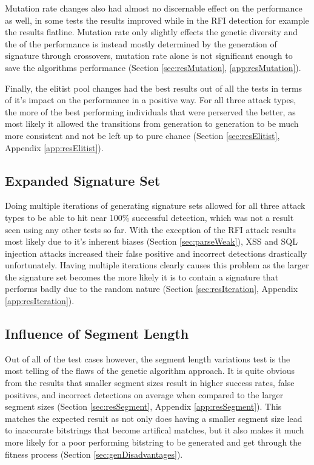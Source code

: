 Mutation rate changes also had almost no discernable effect on the performance as well, in some tests the results improved while in the RFI detection for example the results flatline.  Mutation rate only slightly effects the genetic diversity and the of the performance is instead mostly determined by the generation of signature through crossovers, mutation rate alone is not significant enough to save the algorithms performance (Section \ref{sec:resMutation}, \ref{app:resMutation}).

Finally, the elitist pool changes had the best results out of all the tests in terms of it's impact on the performance in a positive way.  For all three attack types, the more of the best performing individuals that were perserved the better, as most likely it allowed the transitions from generation to generation to be much more consistent and not be left up to pure chance (Section \ref{sec:resElitist}, Appendix \ref{app:resElitist}).

\subsection{Expanded Signature Set}

Doing multiple iterations of generating signature sets allowed for all three attack types to be able to hit near 100\% successful detection, which was not a result seen using any other tests so far.  With the exception of the RFI attack results most likely due to it's inherent biases (Section \ref{sec:parseWeak}), XSS and SQL injection attacks increased their false positive and incorrect detections drastically unfortunately.  Having multiple iterations clearly causes this problem as the larger the signature set becomes the more likely it is to contain a signature that performs badly due to the random nature (Section \ref{sec:resIteration}, Appendix \ref{app:resIteration}).

\subsection{Influence of Segment Length}

Out of all of the test cases however, the segment length variations test is the most telling of the flaws of the genetic algorithm approach.  It is quite obvious from the results that smaller segment sizes result in higher success rates, false positives, and incorrect detections on average when compared to the larger segment sizes (Section \ref{sec:resSegment}, Appendix \ref{app:resSegment}).  This matches the expected result as not only does having a smaller segment size lead to inaccurate bitstrings that become artifical matches, but it also makes it much more likely for a poor performing bitstring to be generated and get through the fitness process (Section \ref{sec:genDisadvantages}).

